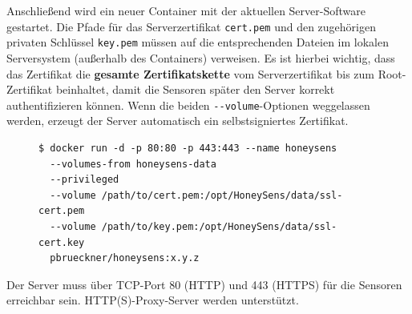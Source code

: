 \documentclass[12pt]{article}
\begin{document}
Anschließend wird ein neuer Container mit der aktuellen Server-Software gestartet. Die Pfade für das Serverzertifikat \verb|cert.pem| und den zugehörigen privaten Schlüssel \verb|key.pem| müssen auf die entsprechenden Dateien im lokalen Serversystem (außerhalb des Containers) verweisen. Es ist hierbei wichtig, dass das Zertifikat die \textbf{gesamte Zertifikatskette} vom Serverzertifikat bis zum Root-Zertifikat beinhaltet, damit die Sensoren später den Server korrekt authentifizieren können. Wenn die beiden \verb|--volume|-Optionen weggelassen werden, erzeugt der Server automatisch ein selbstsigniertes Zertifikat.
\begin{figure}[!h]
	\begin{lstlisting}
$ docker run -d -p 80:80 -p 443:443 --name honeysens
  --volumes-from honeysens-data
  --privileged
  --volume /path/to/cert.pem:/opt/HoneySens/data/ssl-cert.pem
  --volume /path/to/key.pem:/opt/HoneySens/data/ssl-cert.key
  pbrueckner/honeysens:x.y.z
	\end{lstlisting}
\end{figure}

Der Server muss über TCP-Port 80 (HTTP) und 443 (HTTPS) für die Sensoren erreichbar sein. HTTP(S)-Proxy-Server werden unterstützt.
\end{document}
